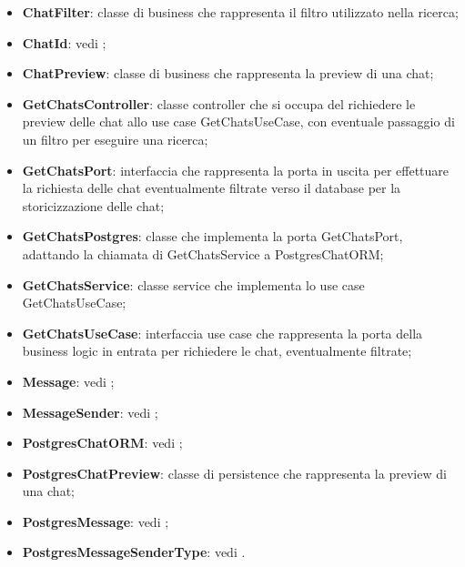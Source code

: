 \documentclass[10pt, a4paper]{article}
\begin{document}
\begin{itemize}
    \item \label{ChatFilter}\textbf{ChatFilter}: classe di business che rappresenta il filtro utilizzato nella ricerca;
    \item \textbf{ChatId}: vedi ;
    \item \label{ChatPreview}\textbf{ChatPreview}: classe di business che rappresenta la preview di una chat;
    \item \label{GetChatsController}\textbf{GetChatsController}: classe controller che si occupa del richiedere le preview delle chat allo use case GetChatsUseCase, con eventuale passaggio di un filtro per eseguire una ricerca;
    \item \label{GetChatsPort}\textbf{GetChatsPort}: interfaccia che rappresenta la porta in uscita per effettuare la richiesta delle chat eventualmente filtrate verso il database per la storicizzazione delle chat;
    \item \label{GetChatsPostgres}\textbf{GetChatsPostgres}: classe che implementa la porta GetChatsPort, adattando la chiamata di GetChatsService a PostgresChatORM;
    \item \label{GetChatsService}\textbf{GetChatsService}: classe service che implementa lo use case GetChatsUseCase;
    \item \label{GetChatsUseCase}\textbf{GetChatsUseCase}: interfaccia use case che rappresenta la porta della business logic in entrata per richiedere le chat, eventualmente filtrate;
    \item \textbf{Message}: vedi ;
    \item \textbf{MessageSender}: vedi ;
    \item \textbf{PostgresChatORM}: vedi ;
    \item \label{PostgresChatPreview}\textbf{PostgresChatPreview}: classe di persistence che rappresenta la preview di una chat;
    \item \textbf{PostgresMessage}: vedi ;
    \item \textbf{PostgresMessageSenderType}: vedi .
\end{itemize}
\end{document}
